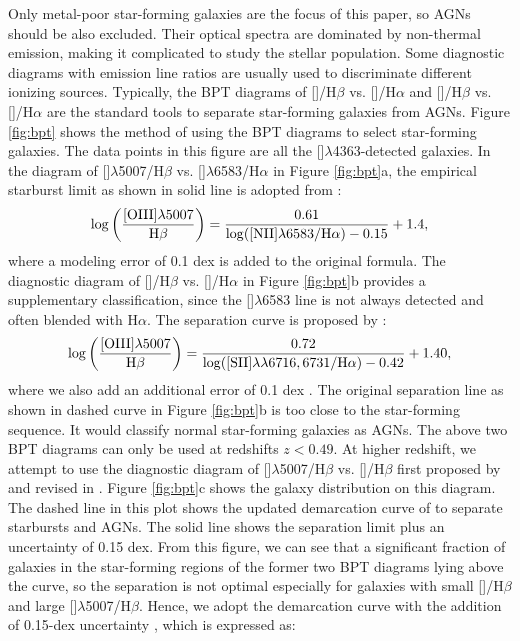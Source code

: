 \documentclass[twocolumn]{aastex631}
\newcommand{\Ha}{\mbox{H$\alpha$}}      %
\newcommand{\Hb}{\mbox{H$\beta$}}       %
\newcommand{\SII}{[\mbox{\ion{S}{2}}]}    %
\newcommand{\OIII}{[\mbox{\ion{O}{3}}]}   %
\newcommand{\NII}{[\mbox{\ion{N}{2}}]}   %
\newcommand{\NIIS}{[\mbox{\ion{N}{2}}]$\lambda$6583}
\newcommand{\OIIIFIZ}{[\mbox{\ion{O}{3}}]$\lambda$5007}
\newcommand{\OIIIFOT}{[\mbox{\ion{O}{3}}]$\lambda$4363}
\newcommand{\OII}{[\mbox{\ion{O}{2}}]}    %
\newcommand{\boldtext}[1]{\textcolor[rgb]{0,0,0}{#1}}
\begin{document}
Only metal-poor star-forming galaxies are the focus of this paper, so AGNs should be also excluded. Their optical spectra are dominated by non-thermal emission, making it complicated to study the stellar population. Some diagnostic diagrams with emission line ratios are usually used to discriminate different ionizing sources. Typically, the BPT diagrams \citep{Bal81} of {\OIII/\Hb} vs. {\NII/\Ha} and  {\OIII/\Hb} vs. {\SII/\Ha} are the standard tools to separate star-forming galaxies from AGNs. Figure \ref{fig:bpt} shows the method of using the BPT diagrams to select star-forming galaxies. The data points in this figure are all the \OIIIFOT-detected galaxies. In the diagram of {\OIIIFIZ/\Hb} vs. {\NIIS/\Ha} in Figure \ref{fig:bpt}a, the empirical starburst limit as shown in solid line is adopted from \citet{Kau03}:
\begin{equation}
{\rm \log\left(\frac{[OIII]\lambda5007}{H\beta}\right) = \frac{0.61}{\log([NII]\lambda6583/H\alpha)-0.15}+1.4}, 
\end{equation} 
where a modeling error of 0.1 dex \citep{Kau03} is added to the original formula. The diagnostic diagram of {\OIII/\Hb} vs. {\SII/\Ha} in Figure \ref{fig:bpt}b provides a supplementary classification, since the {\NIIS} line is not always detected and often blended with {\Ha}. The separation curve is proposed by \citet{Kew01}:
\begin{equation}
{\rm \log\left(\frac{[OIII]\lambda5007}{H\beta}\right) = \frac{0.72}{\log([SII]\lambda\lambda6716,6731/H\alpha)-0.42}+1.40},
\end{equation} 
where we also add an additional error of 0.1 dex \citep{Kew01}. The original separation line as shown in dashed curve in Figure \ref{fig:bpt}b is too close to the star-forming sequence. It would classify normal star-forming galaxies as AGNs. The above two BPT diagrams can only be used at redshifts $z<0.49$. At higher redshift, we attempt to use the diagnostic diagram of {\OIIIFIZ/\Hb} vs. {\OII/\Hb} first proposed by \citet{Lam04} and revised in \citet{Lam10}. Figure \ref{fig:bpt}c shows the galaxy distribution on this diagram. The dashed line in this plot shows the updated demarcation curve of \citet{Lam10} to separate starbursts and AGNs. The solid line shows the separation limit plus an uncertainty of 0.15 dex. \boldtext{From this figure, we can see that a significant fraction of galaxies in the star-forming regions of the former two BPT diagrams lying above the curve, so the \citet{Lam10} separation is not optimal especially for galaxies with small {\OII/\Hb} and large {\OIIIFIZ/\Hb}.} Hence, we adopt the demarcation curve with the addition of 0.15-dex uncertainty \citep{Lam10}, which is expressed as:
\end{document}
